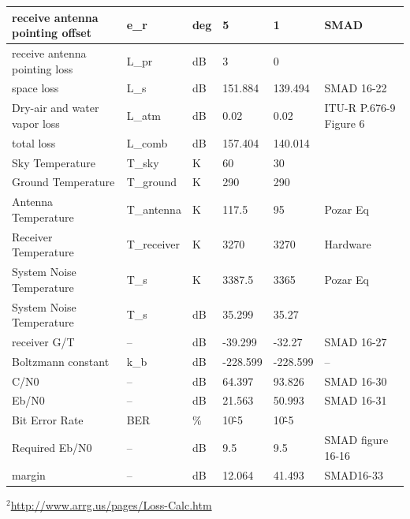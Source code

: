 \documentclass[12pt]{article}
\begin{document}
\begin{center}
\begin{longtable}{| p{3.9cm} | p{1.6cm} | p{1.4cm} | p{1.4cm} | p{1.4cm} | p{5cm} |}
    receive antenna pointing offset & e\_r  & deg   & 5     & 1     & SMAD \\\hline
    receive antenna pointing loss & L\_pr & dB    & 3     & 0     &  \\\hline
    space loss & L\_s  & dB    & 151.884 & 139.494 & SMAD 16-22 \\\hline
    Dry-air and water vapor loss & L\_atm & dB    & 0.02  & 0.02  & ITU-R P.676-9 Figure 6 \\\hline
    total loss & L\_comb & dB    & 157.404 & 140.014 &  \\\hline
    Sky Temperature & T\_sky & K     & 60    & 30    &  \\\hline
    Ground Temperature & T\_ground & K     & 290   & 290   &  \\\hline
    Antenna Temperature & T\_antenna & K     & 117.5 & 95    & Pozar Eq \\\hline
    Receiver Temperature & T\_receiver & K     & 3270  & 3270  & Hardware \\\hline
    System Noise Temperature & T\_s  & K     & 3387.5 & 3365  & Pozar Eq \\\hline
    System Noise Temperature & T\_s  & dB    & 35.299 & 35.27 &  \\\hline
    receiver G/T & --    & dB    & -39.299 & -32.27 & SMAD 16-27 \\\hline
    Boltzmann constant & k\_b  & dB    & -228.599 & -228.599 & -- \\\hline
    C/N0  & --    & dB    & 64.397 & 93.826 & SMAD 16-30 \\\hline
    Eb/N0 & --    & dB    & 21.563 & 50.993 & SMAD 16-31 \\\hline
    Bit Error Rate & BER   & \%    & 10\^-5 & 10\^-5 &  \\\hline
    Required Eb/N0 & --    & dB    & 9.5   & 9.5   & SMAD figure 16-16 \\\hline
    margin & --    & dB    & 12.064 & 41.493 & SMAD16-33 \\
\hline
\end{longtable}
\end{center}
$^2$\url{http://www.arrg.us/pages/Loss-Calc.htm}

\newpage
\end{document}
